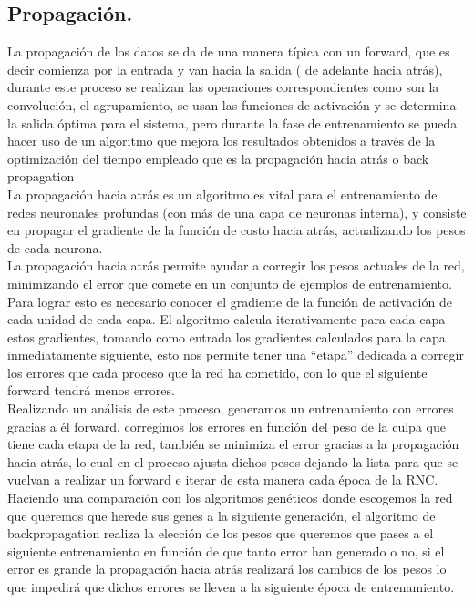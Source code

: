 \documentclass[a4paper, 12pt]{article}
\begin{document}
    \subsection{Propagación.}
    La propagación de los datos se da de una manera típica con un forward, que es decir comienza por la entrada y van hacia la salida ( de adelante hacia atrás), durante este proceso se realizan las operaciones correspondientes como son la convolución, el agrupamiento, se usan las funciones de activación y se determina la salida óptima para el sistema, pero durante la fase de entrenamiento se pueda hacer uso de un algoritmo que mejora los resultados obtenidos a través de la optimización del tiempo empleado que es la propagación hacia atrás o back propagation\\
    La propagación hacia atrás es un algoritmo es vital para el entrenamiento de redes neuronales profundas (con más de una capa de neuronas interna), y consiste en propagar el gradiente de la función de costo hacia atrás, actualizando los pesos de cada neurona.\\
    La propagación hacia atrás permite ayudar a corregir los pesos actuales de la red, minimizando el error que comete en un conjunto de ejemplos de entrenamiento. Para lograr esto es necesario conocer el gradiente de la función de activación de cada unidad de cada capa. El algoritmo calcula iterativamente para cada capa estos gradientes, tomando como entrada los gradientes calculados para la capa inmediatamente siguiente, esto nos permite tener una “etapa” dedicada a corregir los errores que cada proceso que la red ha cometido, con lo que el siguiente forward tendrá menos errores.\\
    Realizando un análisis de este proceso, generamos un entrenamiento con errores gracias a él forward, corregimos los errores en función del peso de la culpa que tiene cada etapa de la red, también se minimiza el error gracias a la propagación hacia atrás, lo cual en el proceso ajusta dichos pesos dejando la lista para que se vuelvan a realizar un forward e iterar de esta manera cada época de la RNC. Haciendo una comparación con los algoritmos genéticos donde escogemos la red que queremos que herede sus genes a la siguiente generación, el algoritmo de backpropagation realiza la elección de los pesos que queremos que pases a el siguiente entrenamiento en función de que tanto error han generado o no, si el error es grande la propagación hacia atrás realizará los cambios de los pesos lo que impedirá que dichos errores se lleven a la siguiente época de entrenamiento.
\end{document}
